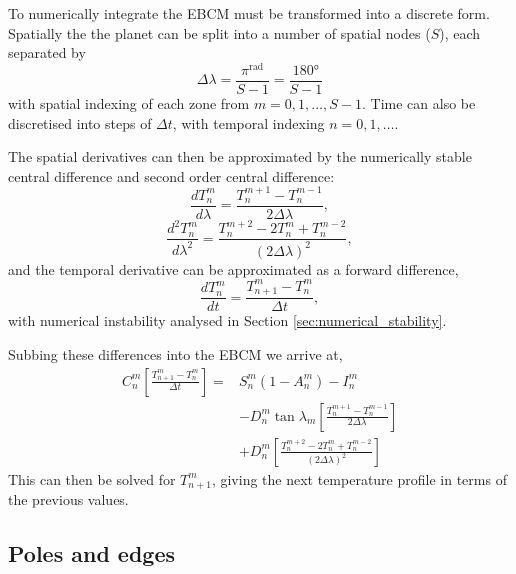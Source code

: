 \documentclass[12pt, onecolumn]{revtex4-2}    %
\begin{document}
To numerically integrate the EBCM must be transformed into a discrete form. Spatially the the planet can be split into a number of spatial nodes ($S$), each separated by
\begin{equation*}
    \Delta\lambda = \frac{\pi^{\unit{\radian}}}{S - 1} = \frac{180\unit{\degree}}{S - 1}
\end{equation*}
with spatial indexing of each zone from $m=0, 1, \dots, S-1$.
Time can also be discretised into steps of $\Delta t$, with temporal indexing $n=0,1,\dots$.

The spatial derivatives can then be approximated by the numerically stable central difference and second order central difference:
\begin{equation} \label{eq:space_1}
    \frac{dT^m_n}{d\lambda} = \frac{T^{m+1}_n - T^{m-1}_n}{2 \Delta\lambda},
\end{equation}
\begin{equation} \label{eq:space_2}
    \frac{d^2T^m_n}{d\lambda^2} = \frac{T^{m+2}_n -2T^m_n + T^{m-2}_n}{(2 \Delta\lambda)^2},
\end{equation}
and the temporal derivative can be approximated as a forward difference,
\begin{equation} \label{eq:time_1}
    \frac{dT^m_n}{dt} = \frac{T^m_{n+1} - T^m_n}{\Delta t},
\end{equation}
with numerical instability analysed in Section \ref{sec:numerical_stability}.

Subbing these differences into the EBCM we arrive at,
\begin{equation} \label{eq:discretised_PDE}
    \begin{aligned}
        C^m_n \left[\frac{T^m_{n+1} - T^m_n}{\Delta t}\right] = & S^m_n(1-A^m_n) - I^m_n                                                           \\
                                                                & - D^m_n \tan \lambda_m \left[\frac{T^{m+1}_n - T^{m-1}_n}{2\Delta\lambda}\right] \\
                                                                & + D^m_n \left[\frac{T^{m+2}_n - 2T^m_n + T^{m-2}_n}{(2\Delta\lambda)^2}\right]
    \end{aligned}
\end{equation}
This can then be solved for $T^m_{n+1}$, giving the next temperature profile in terms of the previous values.

\subsection{Poles and edges} \label{sec:PolesEdges}
\end{document}
